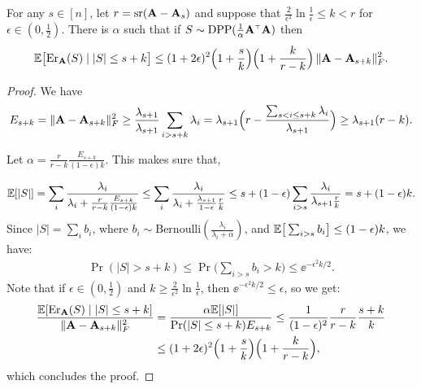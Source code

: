 \documentclass{article}
\begin{document}
  \begin{theorem}\label{t:generalupperbound}
    For any $s\in[n]$, let $r={\mathrm{sr}}(\mathbf A-\mathbf A_s)$ and suppose that
    $\frac2{\epsilon^2}\ln\frac1\epsilon\leq k<r$ for $\epsilon\in(0,\frac12)$.
There is $\alpha$ such that if $S\sim\DPP(\frac1\alpha\A^\top\A)$ then
\begin{align*}
  \E\big[\Er_\A(S)\mid |S|\leq s+k\big]\leq (1+2\epsilon)^2 \Big(1+\frac
          sk\Big)\Big(1 + \frac{k}{r-k}\Big)\,\|\A -
  \A_{s+k}\|_F^2.%
\end{align*}
  \end{theorem}
\begin{proof}
	We have
	\begin{align*}
	E_{s+k}=\|\mathbf A-\mathbf A_{s+k}\|_F^2\geq 
	\frac{\lambda_{s+1}}{\lambda_{s+1}}\sum_{i>s+k}\lambda_i
          =\lambda_{s+1} \Big( r -
          \frac{\sum_{s< i\leq s+k}\lambda_i}{\lambda_{s+1}}\Big)\geq
\lambda_{s+1}(r - k).
	\end{align*}
	
Let $\alpha = \frac{r}{r-k}\frac{E_{s+k}}{(1-\epsilon)k}$. This makes sure that, 

\begin{align*}
  \mathbb E[|S|] = \sum_i\frac{\lambda_i}{\lambda_i+\frac{r}{r-k} \frac{E_{s+k}}{(1-\epsilon)k}}
  \leq \sum_i\frac{\lambda_i}{\lambda_i+\frac{\lambda_{s+1}}{1-\epsilon}\frac{r}{k}}
  \leq
  s+(1-\epsilon)\sum_{i>s}\frac{\lambda_i}{\lambda_{s+1}\frac{r}k}
  =s + (1-\epsilon)k.
\end{align*}
Since $|S|=\sum_i b_i$, where
$b_i\sim\mathrm{Bernoulli}(\frac{\lambda_i}{\lambda_i+\alpha})$, and
$\mathbb E\big[\sum_{i>s}b_i\big]\leq (1-\epsilon)k$, we have:
\begin{align*}
  \Pr(|S|>s+k)\leq \Pr\Big(\sum_{i>s}b_i>k\Big)\leq \ee^{-\epsilon^2 k/2}.
\end{align*}
Note that if $\epsilon\in(0,\frac12)$ and $k\geq
\frac2{\epsilon^2}\ln\frac1\epsilon$, then $\ee^{-\epsilon^2 k/2}\leq
\epsilon$, so we get:
	\begin{align*}
          \frac{\mathbb E[\mathrm{Er}_{\mathbf A}(S)\mid |S|\leq s+k]}{\|\mathbf A-\mathbf A_{s+k}\|_F^2}
          &= \frac{\alpha \mathbb E[|S|]}{\mathrm{Pr}(|S|\leq s+k) E_{s+k}} 
          \leq
            \frac{1}{(1-\epsilon)^2}\frac{r}{r-k}\frac{s+k}{k} \\
          &\leq (1+2\epsilon)^2 \Big(1+\frac
          sk\Big)\Big(1 + \frac{k}{r-k}\Big),
	\end{align*}
        which concludes the proof.
\end{proof}
\end{document}
